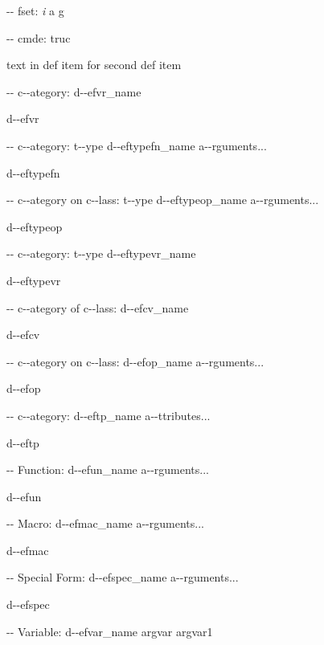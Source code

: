 \documentclass{book}
\begin{document}
\hbox{}{-}{-} fset: \emph{i} a g


%
\hbox{}{-}{-} cmde: truc 


%
text in def item for second def item

\hbox{}{-}{-} c{-}{-}ategory: d{-}{-}efvr\_name


%
d{-}{-}efvr

\hbox{}{-}{-} c{-}{-}ategory: t{-}{-}ype d{-}{-}eftypefn\_name a{-}{-}rguments...


%
d{-}{-}eftypefn

\hbox{}{-}{-} c{-}{-}ategory on c{-}{-}lass: t{-}{-}ype d{-}{-}eftypeop\_name a{-}{-}rguments...


%
d{-}{-}eftypeop

\hbox{}{-}{-} c{-}{-}ategory: t{-}{-}ype d{-}{-}eftypevr\_name


%
d{-}{-}eftypevr

\hbox{}{-}{-} c{-}{-}ategory of c{-}{-}lass: d{-}{-}efcv\_name


%
d{-}{-}efcv

\hbox{}{-}{-} c{-}{-}ategory on c{-}{-}lass: d{-}{-}efop\_name a{-}{-}rguments...


%
d{-}{-}efop

\hbox{}{-}{-} c{-}{-}ategory: d{-}{-}eftp\_name a{-}{-}ttributes...


%
d{-}{-}eftp

\hbox{}{-}{-} Function: d{-}{-}efun\_name a{-}{-}rguments...


%
d{-}{-}efun

\hbox{}{-}{-} Macro: d{-}{-}efmac\_name a{-}{-}rguments...


%
d{-}{-}efmac

\hbox{}{-}{-} Special Form: d{-}{-}efspec\_name a{-}{-}rguments...


%
d{-}{-}efspec

\hbox{}{-}{-} Variable: d{-}{-}efvar\_name argvar argvar1
\end{document}
